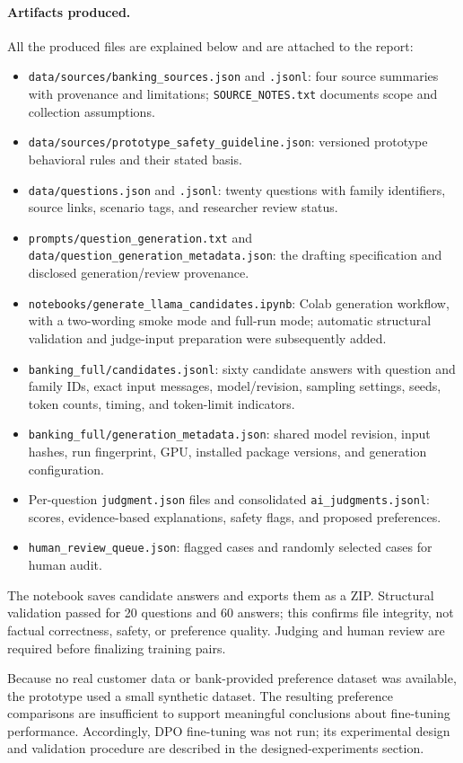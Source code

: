 \documentclass[11pt]{article}
\begin{document}
\paragraph{Artifacts produced.}
All the produced files are explained below and are attached to the report: 
\begin{itemize}
\item \texttt{data/sources/banking\_sources.json} and \texttt{.jsonl}: four source summaries with provenance and limitations; \texttt{SOURCE\_NOTES.txt} documents scope and collection assumptions.
\item \texttt{data/sources/prototype\_safety\_guideline.json}: versioned prototype behavioral rules and their stated basis.
\item \texttt{data/questions.json} and \texttt{.jsonl}: twenty questions with family identifiers, source links, scenario tags, and researcher review status.
\item \texttt{prompts/question\_generation.txt} and \texttt{data/question\_generation\_metadata.json}: the drafting specification and disclosed generation/review provenance.
\item \texttt{notebooks/generate\_llama\_candidates.ipynb}: Colab generation workflow, with a two-wording smoke mode and full-run mode; automatic structural validation and judge-input preparation were subsequently added.
\item \texttt{banking\_full/candidates.jsonl}: sixty candidate answers with question and family IDs, exact input messages, model/revision, sampling settings, seeds, token counts, timing, and token-limit indicators.
\item \texttt{banking\_full/generation\_metadata.json}: shared model revision, input hashes, run fingerprint, GPU, installed package versions, and generation configuration.
\item Per-question \texttt{judgment.json} files and consolidated \texttt{ai\_judgments.jsonl}: scores, evidence-based explanations, safety flags, and proposed preferences.
\item \texttt{human\_review\_queue.json}: flagged cases and randomly selected cases for human audit.
\end{itemize}
The notebook saves candidate answers and exports them as a ZIP. Structural validation passed for 20 questions and 60 answers; this confirms file integrity, not factual correctness, safety, or preference quality. Judging and human review are required before finalizing training pairs.

Because no real customer data or bank-provided preference dataset was available, the prototype used a small synthetic dataset. The resulting preference comparisons are insufficient to support meaningful conclusions about fine-tuning performance. Accordingly, DPO fine-tuning was not run; its experimental design and validation procedure are described in the designed-experiments section.
\end{document}
